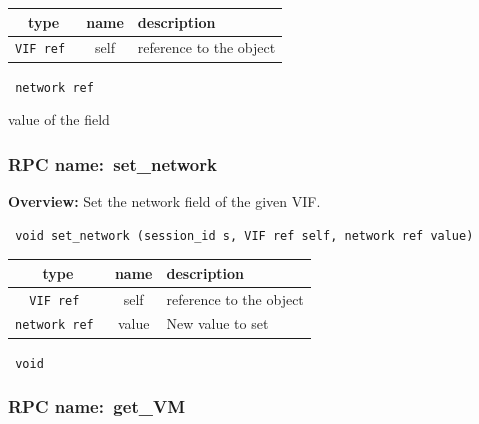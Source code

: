  
\vspace{0.3cm}
\begin{tabular}{|c|c|p{7cm}|}
 \hline
{\bf type} & {\bf name} & {\bf description} \\ \hline
{\tt VIF ref } & self & reference to the object \\ \hline 

\end{tabular}

\vspace{0.3cm}

{\tt 
network ref
}


value of the field
\vspace{0.3cm}
\vspace{0.3cm}
\vspace{0.3cm}
\subsubsection{RPC name:~set\_network}

{\bf Overview:} 
Set the network field of the given VIF.

\begin{verbatim} void set_network (session_id s, VIF ref self, network ref value)\end{verbatim}



 
\vspace{0.3cm}
\begin{tabular}{|c|c|p{7cm}|}
 \hline
{\bf type} & {\bf name} & {\bf description} \\ \hline
{\tt VIF ref } & self & reference to the object \\ \hline 

{\tt network ref } & value & New value to set \\ \hline 

\end{tabular}

\vspace{0.3cm}

{\tt 
void
}



\vspace{0.3cm}
\vspace{0.3cm}
\vspace{0.3cm}
\subsubsection{RPC name:~get\_VM}

